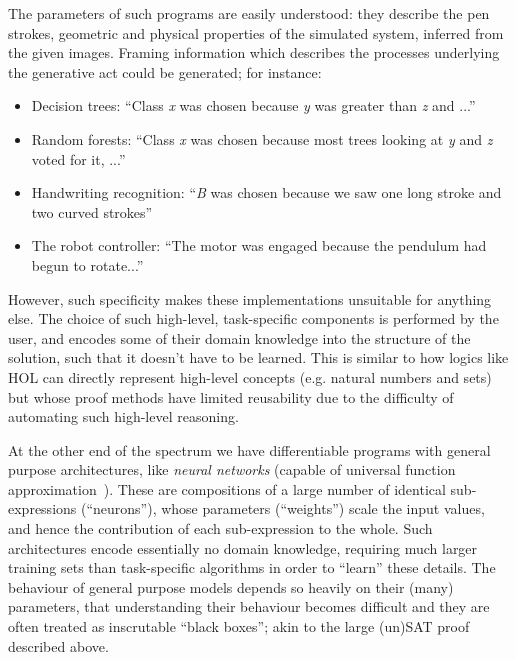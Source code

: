 \documentclass[letterpaper]{article}
\begin{document}
The parameters of such programs are easily understood: they describe
the pen strokes, geometric and physical properties of the simulated
system, inferred from the given images. Framing information which
describes the processes underlying the generative act could be
generated; for instance:

\begin{itemize}
\item Decision trees: ``Class {\em x} was chosen because {\em y} was
  greater than {\em z} and ...''
\item Random forests: ``Class {\em x} was chosen because most trees
  looking at {\em y} and {\em z} voted for it, ...''
\item Handwriting recognition: ``{\em B} was chosen because we saw one
  long stroke and two curved strokes''
\item The robot controller: ``The motor was engaged because the
  pendulum had begun to rotate...''
\end{itemize}


However, such specificity makes these implementations
unsuitable for anything else. The choice of such high-level, task-specific
components is performed by the user, and encodes some of their domain knowledge
into the structure of the solution, such that it doesn't have to be learned.
This is similar to how logics like HOL can directly represent high-level
concepts (e.g. natural numbers and sets) but whose proof methods have limited
reusability due to the difficulty of automating such high-level reasoning.

At the other end of the spectrum we have differentiable programs with general
purpose architectures, like \emph{neural networks} (capable of universal
function approximation~\cite{funahashi1989approximate}). These are compositions
of a large number of identical sub-expressions (``neurons''), whose parameters
(``weights'') scale the input values, and hence the contribution of each
sub-expression to the whole. Such architectures encode essentially no domain
knowledge, requiring much larger training sets than task-specific algorithms in
order to ``learn'' these details.  The behaviour of general purpose models
depends so heavily on their (many) parameters, that understanding their
behaviour becomes difficult and they are often treated as inscrutable ``black
boxes''; akin to the large (un)SAT proof described above. 
\end{document}
